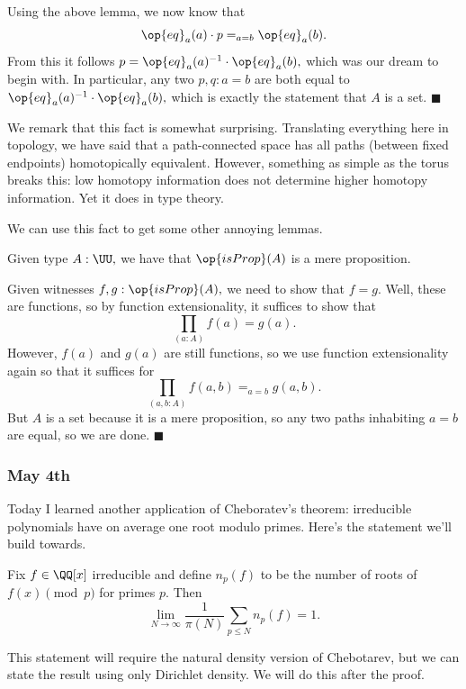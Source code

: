 Using the above lemma, we now know that
\[\op{eq}_a(a)\cdot p=_{a=b}\op{eq}_a(b).\]
From this it follows $p=\op{eq}_a(a)^{-1}\cdot\op{eq}_a(b),$ which was our dream to begin with. In particular, any two $p,q:a=b$ are both equal to $\op{eq}_a(a)^{-1}\cdot\op{eq}_a(b),$ which is exactly the statement that $A$ is a set. $\blacksquare$

We remark that this fact is somewhat surprising. Translating everything here in topology, we have said that a path-connected space has all paths (between fixed endpoints) homotopically equivalent. However, something as simple as the torus breaks this: low homotopy information does not determine higher homotopy information. Yet it does in type theory.

We can use this fact to get some other annoying lemmas.
\begin{lemma}
    Given type $A:\UU,$ we have that $\op{isProp}(A)$ is a mere proposition.
\end{lemma}
Given witnesses $f,g:\op{isProp}(A),$ we need to show that $f=g.$ Well, these are functions, so by function extensionality, it suffices to show that
\[\prod_{(a:A)}f(a)=g(a).\]
However, $f(a)$ and $g(a)$ are still functions, so we use function extensionality again so that it suffices for
\[\prod_{(a,b:A)}f(a,b)=_{a=b}g(a,b).\]
But $A$ is a set because it is a mere proposition, so any two paths inhabiting $a=b$ are equal, so we are done. $\blacksquare$

\subsubsection{May 4th}
Today I learned another application of Cheboratev's theorem: irreducible polynomials have on average one root modulo primes. Here's the statement we'll build towards.
\begin{theorem}
    Fix $f\in\QQ[x]$ irreducible and define $n_p(f)$ to be the number of roots of $f(x)\pmod p$ for primes $p.$ Then
    \[\lim_{N\to\infty}\frac1{\pi(N)}\sum_{p\le N}n_p(f)=1.\]
\end{theorem}
This statement will require the natural density version of Chebotarev, but we can state the result using only Dirichlet density. We will do this after the proof.

